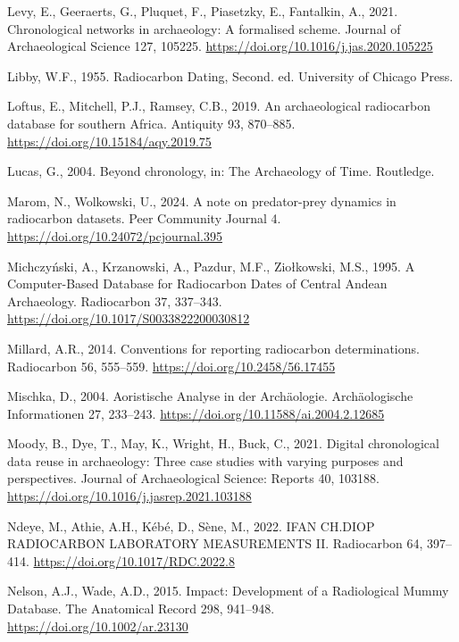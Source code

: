 \documentclass[
  number,
  doubleblind]{elsarticle}
\newlength{\cslhangindent}
\newenvironment{CSLReferences}[2] %
 {\begin{list}{}{%
  \setlength{\itemindent}{0pt}
  \setlength{\leftmargin}{0pt}
  \setlength{\parsep}{0pt}
  \ifodd #1
   \setlength{\leftmargin}{\cslhangindent}
   \setlength{\itemindent}{-1\cslhangindent}
  \fi
  \setlength{\itemsep}{#2\baselineskip}}}
 {\end{list}}
\begin{document}
\begin{CSLReferences}{1}{0}
Levy, E., Geeraerts, G., Pluquet, F., Piasetzky, E., Fantalkin, A.,
2021. Chronological networks in archaeology: {A} formalised scheme.
Journal of Archaeological Science 127, 105225.
\url{https://doi.org/10.1016/j.jas.2020.105225}

Libby, W.F., 1955. Radiocarbon {Dating}, Second. ed. University of
Chicago Press.

Loftus, E., Mitchell, P.J., Ramsey, C.B., 2019. An archaeological
radiocarbon database for southern {Africa}. Antiquity 93, 870--885.
\url{https://doi.org/10.15184/aqy.2019.75}

Lucas, G., 2004. Beyond chronology, in: The {Archaeology} of {Time}.
Routledge.

Marom, N., Wolkowski, U., 2024. A note on predator-prey dynamics in
radiocarbon datasets. Peer Community Journal 4.
\url{https://doi.org/10.24072/pcjournal.395}

Michczyński, A., Krzanowski, A., Pazdur, M.F., Ziołkowski, M.S., 1995. A
{Computer-Based Database} for {Radiocarbon Dates} of {Central Andean
Archaeology}. Radiocarbon 37, 337--343.
\url{https://doi.org/10.1017/S0033822200030812}

Millard, A.R., 2014. Conventions for reporting radiocarbon
determinations. Radiocarbon 56, 555--559.
\url{https://doi.org/10.2458/56.17455}

Mischka, D., 2004. Aoristische Analyse in der Archäologie.
Archäologische Informationen 27, 233--243.
\url{https://doi.org/10.11588/ai.2004.2.12685}

Moody, B., Dye, T., May, K., Wright, H., Buck, C., 2021. Digital
chronological data reuse in archaeology: {Three} case studies with
varying purposes and perspectives. Journal of Archaeological Science:
Reports 40, 103188. \url{https://doi.org/10.1016/j.jasrep.2021.103188}

Ndeye, M., Athie, A.H., Kébé, D., Sène, M., 2022. {IFAN CH}.{DIOP
RADIOCARBON LABORATORY MEASUREMENTS II}. Radiocarbon 64, 397--414.
\url{https://doi.org/10.1017/RDC.2022.8}

Nelson, A.J., Wade, A.D., 2015. Impact: {Development} of a {Radiological
Mummy Database}. The Anatomical Record 298, 941--948.
\url{https://doi.org/10.1002/ar.23130}


\end{CSLReferences}
\end{document}
